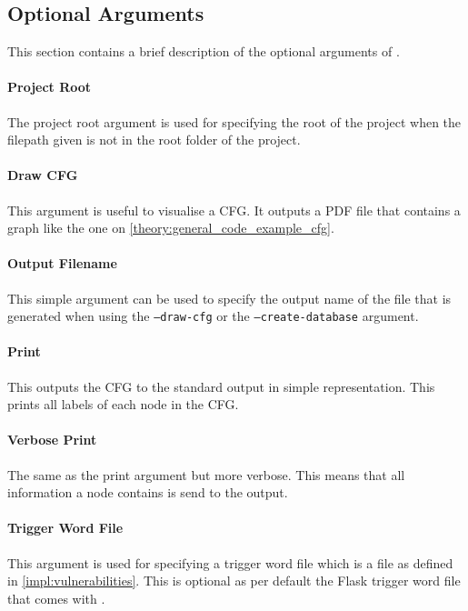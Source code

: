 \subsection{Optional Arguments}\label{pyt:optional}
This section contains a brief description of the optional arguments of \pyt{}.

\paragraph{Project Root}
The project root argument is used for specifying the root of the project when the filepath given is not in the root folder of the project.

\paragraph{Draw CFG}
This argument is useful to visualise a CFG.
It outputs a PDF file that contains a graph like the one on \cref{theory:general_code_example_cfg}.

\paragraph{Output Filename}
This simple argument can be used to specify the output name of the file that is generated when using the \texttt{--draw-cfg} or the \texttt{--create-database} argument.

\paragraph{Print}
This outputs the CFG to the standard output in simple representation.
This prints all labels of each node in the CFG.

\paragraph{Verbose Print}
The same as the print argument but more verbose.
This means that all information a node contains is send to the output.

\paragraph{Trigger Word File}
This argument is used for specifying a trigger word file which is a file as defined in \cref{impl:vulnerabilities}.
This is optional as per default the Flask trigger word file that comes with \pyt{}.

